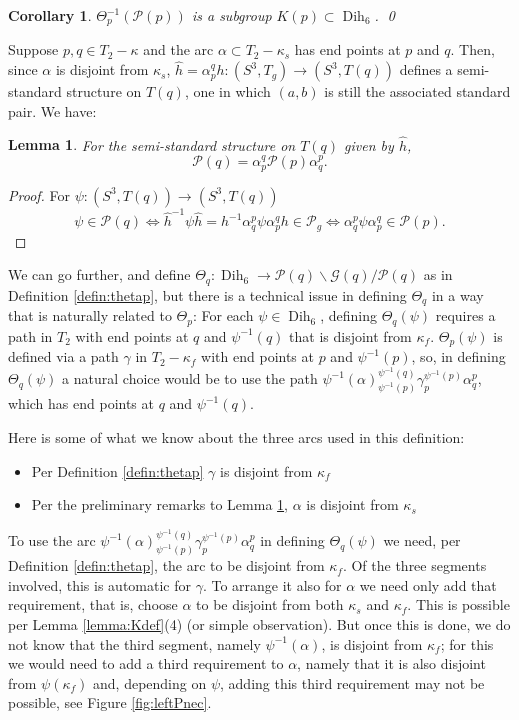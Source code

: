 \documentclass[12pt]{amsart}
\newtheorem{cor}[thm]{Corollary}
\newtheorem{lemma}[thm]{Lemma}
\newcommand{\calG}{\mathcal G}
\newcommand{\calP}{\mathcal P}
\newcommand{\bs}{\backslash}
\newcommand{\Dih}{\operatorname{Dih}}
\begin{document}
\begin{cor} \label{cor:Kpexist}  $\Theta_p^{-1}(\calP(p))$ is a subgroup $K(p) \subset \Dih_6$. \qed
\end{cor}

Suppose $p, q \in T_2 - \kappa$ and the arc $\alpha \subset T_2 - \kappa_s$ has end points at $p$ and $q$.  Then, since $\alpha$ is disjoint from $\kappa_s$, $\hat{h} = \alpha^q_p h: (S^3, T_g) \to (S^3, T(q))$ defines a semi-standard structure on $T(q)$, one in which $(a, b)$ is still the associated standard pair.  We have:

\begin{lemma}  \label{lemma:Kq} For the semi-standard structure on $T(q)$ given by  $\hat{h}$, $$\calP(q) = \alpha_p^q\calP(p)\alpha_q^p.$$  
\end{lemma}

\begin{proof}  For $\psi: (S^3, T(q)) \to (S^3, T(q))$
 \[\psi \in \calP(q) \iff \hat{h}^{-1}\psi \hat{h} = h^{-1}\alpha^p_q \psi \alpha^q_p h \in \calP_g \iff \alpha^p_q \psi \alpha^q_p \in \calP(p).\]
\end{proof}

We can go further, and define $\Theta_q: \Dih_6 \to \calP(q) \bs \calG(q)/\calP(q)$ as in Definition \ref{defin:thetap}, but there is a technical issue in defining $\Theta_q$ in a  way that is naturally related to $\Theta_p$:  For each $\psi \in \Dih_6$, defining $\Theta_q(\psi)$ requires a path in $T_2$ with end points at $q$ and $\psi^{-1}(q)$ that is disjoint from $\kappa_f$.   $\Theta_p(\psi)$ is defined via a path $\gamma$ in $T_2 - \kappa_f$ with end points at $p$ and $\psi^{-1}(p)$, so, in defining $\Theta_q(\psi)$ a natural choice would be to use the path $\psi^{-1}(\alpha)_{\psi^{-1}(p)}^{\psi^{-1}(q)} \gamma_p^{\psi^{-1}(p)} \alpha_q^p$, which has end points at $q$ and $\psi^{-1}(q)$.  

Here is some of what we know about the three arcs used in this definition:
\begin{itemize}
\item Per Definition \ref{defin:thetap} $\gamma$ is disjoint from $\kappa_f$
\item Per the preliminary remarks to Lemma \ref{lemma:Kq}, $\alpha$ is disjoint from $\kappa_s$
\end{itemize}


To use the arc $\psi^{-1}(\alpha)_{\psi^{-1}(p)}^{\psi^{-1}(q)} \gamma_p^{\psi^{-1}(p)} \alpha_q^p$ in defining $\Theta_q(\psi)$ we need, per Definition \ref{defin:thetap}, the arc to be disjoint from $\kappa_f$.  Of the three segments involved, this is automatic for $\gamma$.  To arrange it also for $\alpha$ we need only add that requirement, that is, choose $\alpha$ to be disjoint from both $\kappa_s$ and $\kappa_f$.  This is possible per Lemma \ref{lemma:Kdef}(4) (or simple observation).  But once this is done, we do not know that the third segment, namely $\psi^{-1}(\alpha)$, is disjoint from $\kappa_f$; for this we would need to add a third requirement to $\alpha$, namely that it is also disjoint from $\psi(\kappa_f)$ and, depending on $\psi$, adding this third requirement may not be possible, see Figure \ref{fig:leftPnec}.
\end{document}
